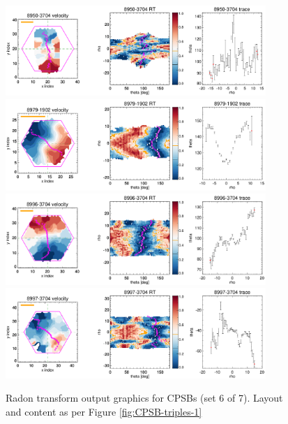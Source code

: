 \documentclass[fleqn,usenatbib]{mnras}
\begin{document}
\begin{figure}
    \centering
    \includegraphics[width=0.88\textwidth]{Images/SN1-MC250/CPSB-triples/CPSB-8950-3704-1-250.png}
    \includegraphics[width=0.88\textwidth]{Images/SN1-MC250/CPSB-triples/CPSB-8979-1902-1-250.png}
    \includegraphics[width=0.88\textwidth]{Images/SN1-MC250/CPSB-triples/CPSB-8996-3704-1-250.png}
    \includegraphics[width=0.88\textwidth]{Images/SN1-MC250/CPSB-triples/CPSB-8997-3704-1-250.png}    
    \caption{Radon transform output graphics for CPSBs (set 6 of 7). Layout and content as per Figure \ref{fig:CPSB-triples-1}}
    \label{fig:CPSB-triples-6}
\end{figure}
\end{document}
